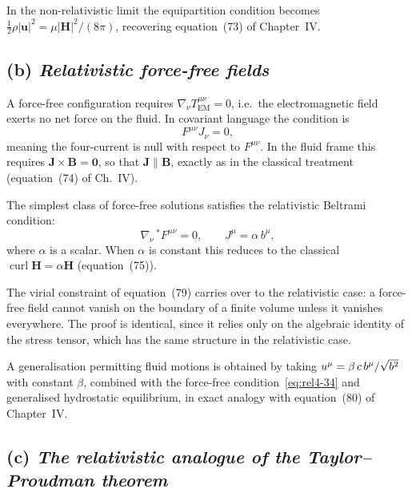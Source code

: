 \begin{relcorrection}
In the non-relativistic limit the equipartition condition becomes
$\tfrac{1}{2}\rho|\mathbf{u}|^{2}=\mu|\mathbf{H}|^{2}/(8\pi)$,
recovering equation~(73) of Chapter~IV.
\end{relcorrection}

\subsection*{(b) \emph{Relativistic force-free fields}}

A force-free configuration requires $\nabla_{\nu}T^{\mu\nu}_{\mathrm{EM}}=0$,
i.e.\ the electromagnetic field exerts no net force on the fluid.  In
covariant language the condition is
\begin{equation}\label{eq:rel4-34}
  F^{\mu\nu}J_{\nu} = 0,
\end{equation}
meaning the four-current is null with respect to $F^{\mu\nu}$.  In the
fluid frame this requires $\mathbf{J}\times\mathbf{B}=\mathbf{0}$, so
that $\mathbf{J}\parallel\mathbf{B}$, exactly as in the classical
treatment (equation~(74) of Ch.~IV).

The simplest class of force-free solutions satisfies the relativistic
Beltrami condition:
\begin{equation}\label{eq:rel4-35}
  \nabla_{\nu}\,{}^{*}\!F^{\mu\nu} = 0,
  \qquad
  J^{\mu} = \alpha\, b^{\mu},
\end{equation}
where $\alpha$ is a scalar.  When $\alpha$ is constant this reduces to the
classical $\operatorname{curl}\mathbf{H}=\alpha\mathbf{H}$
(equation~(75)).

The virial constraint of equation~(79) carries over to the relativistic
case: a force-free field cannot vanish on the boundary of a finite volume
unless it vanishes everywhere.  The proof is identical, since it relies only
on the algebraic identity of the stress tensor, which has the same structure
in the relativistic case.

A generalisation permitting fluid motions is obtained by taking
$u^{\mu}=\beta\,c\,b^{\mu}/\sqrt{b^2}$ with constant $\beta$, combined
with the force-free condition~\eqref{eq:rel4-34} and generalised
hydrostatic equilibrium, in exact analogy with equation~(80) of Chapter~IV.

\subsection*{(c) \emph{The relativistic analogue of the Taylor--Proudman
theorem}}

